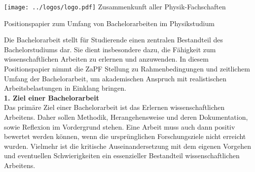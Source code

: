 \documentclass[DIV=calc]{scrartcl}
\let\oldgrqq=\grqq
\def\grqq{\oldgrqq\xspace}
\begin{document}
\hspace{0.87\textwidth}
\begin{minipage}{120pt}
	\vspace{-1.8cm}
	\texttt{[image: ../logos/logo.pdf]}
	\centering
	\small Zusammenkunft aller Physik-Fachschaften
\end{minipage}

\begin{center}
  \huge{Positionspapier zum \glqq Umfang von Bachelorarbeiten im Physikstudium\grqq{}}
  \vspace{.25\baselineskip}
  \normalsize
\end{center}
\vspace{1cm}







Die Bachelorarbeit stellt für Studierende einen zentralen Bestandteil des Bachelorstudiums dar. Sie dient insbesondere dazu, die Fähigkeit zum wissenschaftlichen Arbeiten zu erlernen und anzuwenden. In diesem Positionspapier nimmt die ZaPF Stellung zu Rahmenbedingungen und zeitlichem Umfang der Bachelorarbeit, um akademischen Anspruch mit realistischen Arbeitsbelastungen in Einklang bringen.\\

\textbf{1. Ziel einer Bachelorarbeit}\\
Das primäre Ziel einer Bachelorarbeit ist das Erlernen wissenschaftlichen Arbeitens. Daher sollen Methodik, Herangehensweise und deren Dokumentation, sowie Reflexion im Vordergrund stehen. Eine Arbeit muss auch dann positiv bewertet werden können, wenn die ursprünglichen Forschungsziele nicht erreicht wurden. Vielmehr ist die kritische Auseinandersetzung mit dem eigenen Vorgehen und eventuellen Schwierigkeiten ein essenzieller Bestandteil wissenschaftlichen Arbeitens. \\
\end{document}
